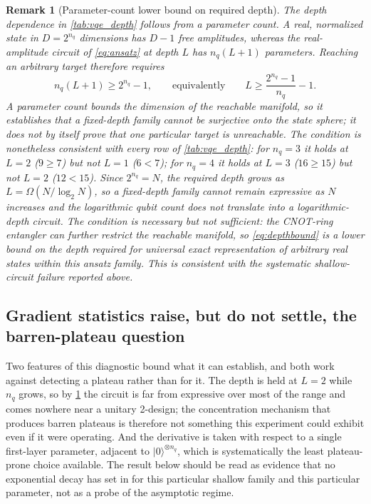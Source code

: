 \documentclass{ieeeaccess}
\newtheorem{remark}{Remark}
\begin{document}
\begin{remark}[Parameter-count lower bound on required depth]\label{rem:depth}
The depth dependence in \cref{tab:vqe_depth} follows from a parameter count. A real, normalized state in $D=2^{n_q}$ dimensions has $D-1$ free amplitudes, whereas the real-amplitude circuit of \cref{eq:ansatz} at depth $L$ has $n_q(L+1)$ parameters. Reaching an arbitrary target therefore requires
\begin{equation}
n_q(L+1)\ge 2^{n_q}-1,
\qquad\text{equivalently}\qquad
L\ge\frac{2^{n_q}-1}{n_q}-1.
\label{eq:depthbound}
\end{equation}
A parameter count bounds the dimension of the reachable manifold, so it establishes that a fixed-depth family cannot be surjective onto the state sphere; it does not by itself prove that one particular target is unreachable. The condition is nonetheless consistent with every row of \cref{tab:vqe_depth}: for $n_q=3$ it holds at $L=2$ ($9\ge7$) but not $L=1$ ($6<7$); for $n_q=4$ it holds at $L=3$ ($16\ge15$) but not $L=2$ ($12<15$). Since $2^{n_q}=N$, the required depth grows as $L=\Omega(N/\log_2 N)$, so a fixed-depth family cannot remain expressive as $N$ increases and the logarithmic qubit count does not translate into a logarithmic-depth circuit. The condition is necessary but not sufficient: the CNOT-ring entangler can further restrict the reachable manifold, so \cref{eq:depthbound} is a lower bound on the depth required for universal exact representation of arbitrary real states within this ansatz family. This is consistent with the systematic shallow-circuit failure reported above.
\end{remark}

\subsection{Gradient statistics raise, but do not settle, the barren-plateau question}

Two features of this diagnostic bound what it can establish, and both work against detecting a plateau rather than for it. The depth is held at $L=2$ while $n_q$ grows, so by \cref{rem:depth} the circuit is far from expressive over most of the range and comes nowhere near a unitary 2-design; the concentration mechanism that produces barren plateaus is therefore not something this experiment could exhibit even if it were operating. And the derivative is taken with respect to a single first-layer parameter, adjacent to $|0\rangle^{\otimes n_q}$, which is systematically the least plateau-prone choice available. The result below should be read as evidence that no exponential decay has set in for this particular shallow family and this particular parameter, not as a probe of the asymptotic regime.
\end{document}
